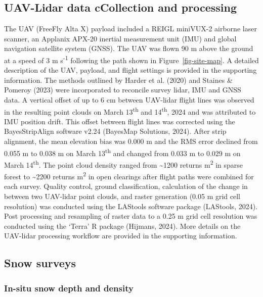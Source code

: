 \documentclass[
  letterpaper,
  DIV=11,
  numbers=noendperiod]{scrartcl}
\begin{document}
\subsection{UAV-Lidar data cCollection and
processing}\label{uav-lidar-data-ccollection-and-processing}

The UAV (FreeFly Alta X) payload included a REIGL miniVUX-2 airborne
laser scanner, an Applanix APX-20 inertial measurement unit (IMU) and
global navigation satellite system (GNSS). The UAV was flown 90 m above
the ground at a speed of 3 m s\textsuperscript{-1} following the path
shown in Figure~\ref{fig-site-map}. A detailed description of the UAV,
payload, and flight settings is provided in the supporting information.
The methods outlined by Harder et al. (2020) and Staines \& Pomeroy
(2023) were incorporated to reconcile survey lidar, IMU and GNSS data. A
vertical offset of up to 6 cm between UAV-lidar flight lines was
observed in the resulting point clouds on March 13\textsuperscript{th}
and 14\textsuperscript{th}, 2024 and was attributed to IMU position
drift. This offset between flight lines was corrected using the
BayesStripAlign software v2.24 (BayesMap Solutions, 2024). After strip
alignment, the mean elevation bias was 0.000 m and the RMS error
declined from 0.055 m to 0.038 m on March 13\textsuperscript{th} and
changed from 0.033 m to 0.029 m on March 14\textsuperscript{th}. The
point cloud density ranged from \textasciitilde1200 returns
m\textsuperscript{2} in sparse forest to \textasciitilde2200 returns
m\textsuperscript{2} in open clearings after flight paths were combined
for each survey. Quality control, ground classification, calculation of
the change in between two UAV-lidar point clouds, and raster generation
(0.05 m grid cell resolution) was conducted using the LAStools software
package (LAStools, 2024). Post processing and resampling of raster data
to a 0.25 m grid cell resolution was conducted using the `Terra' R
package (Hijmans, 2024). More details on the UAV-lidar processing
workflow are provided in the supporting information.

\subsection{Snow surveys}\label{snow-surveys}

\subsubsection{In-situ snow depth and
density}\label{in-situ-snow-depth-and-density}
\end{document}
